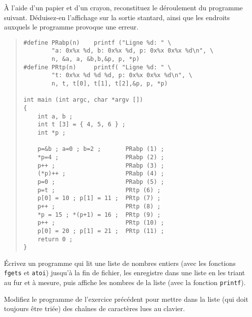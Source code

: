 %




% 


\question

À l'aide d'un papier et d'un crayon, reconstituez le déroulement
du programme suivant. Déduisez-en l'affichage sur la sortie stantard,
ainsi que les endroits auxquels le programme provoque une erreur.

\begin {quote}
\small
\begin {verbatim}
#define PRabp(n)    printf ("Ligne %
        "a: 0x%
        n, &a, a, &b,b,&p, p, *p)
#define PRtp(n)     printf( "Ligne %
        "t: 0x%
        n, t, t[0], t[1], t[2],&p, p, *p)

int main (int argc, char *argv [])
{
    int a, b ;
    int t [3] = { 4, 5, 6 } ;
    int *p ;

    p=&b ; a=0 ; b=2 ;       PRabp (1) ;
    *p=4 ;                   PRabp (2) ;
    p++ ;                    PRabp (3) ;
    (*p)++ ;                 PRabp (4) ;
    p=0 ;                    PRabp (5) ;
    p=t ;                    PRtp (6) ;
    p[0] = 10 ; p[1] = 11 ;  PRtp (7) ;
    p++ ;                    PRtp (8) ;
    *p = 15 ; *(p+1) = 16 ;  PRtp (9) ;
    p++ ;                    PRtp (10) ;
    p[0] = 20 ; p[1] = 21 ;  PRtp (11) ;
    return 0 ;
}
\end{verbatim}
\end {quote}


\question

Écrivez un programme qui lit une liste de nombres entiers (avec les
fonctions {\tt fgets} et {\tt atoi}) jusqu'à la fin de fichier, les
enregistre dans une liste en les triant au fur et à mesure, puis affiche
les nombres de la liste (avec la fonction {\tt printf}).


\question

Modifiez le programme de l'exercice précédent pour mettre dans la
liste (qui doit toujours être triée) des chaînes de caractères lues au
clavier.


